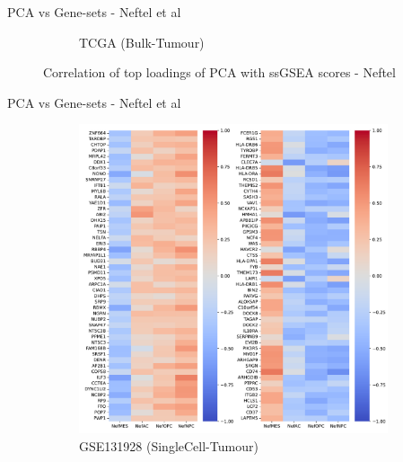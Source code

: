 \documentclass[aspectratio=169,9pt]{beamer}
\begin{document}
\begin{frame}{PCA vs Gene-sets - Neftel et al}
\begin{adjustwidth}{-5cm}{-5cm}
\begin{figure}
\begin{subfigure}[c]{0.48\textwidth}
                    \caption{TCGA (Bulk-Tumour)}
                \end{subfigure}
                \caption{Correlation of top loadings of PCA with ssGSEA scores - Neftel}
            \end{figure}
        \end{adjustwidth}
    \end{frame}

    \begin{frame}{PCA vs Gene-sets - Neftel et al}
        \begin{adjustwidth}{-5cm}{-5cm}
            \centering
            \begin{figure}\ContinuedFloat
                \centering
                \begin{subfigure}[c]{0.48\textwidth}
                    \centering
                    \includegraphics[width=\textwidth]{GSM3828672_load-corr_Nef}
                    \caption{GSE131928 (SingleCell-Tumour)}
                \end{subfigure}
                \begin{subfigure}[c]{0.48\textwidth}
                    \centering

\end{subfigure}
\end{figure}
\end{adjustwidth}
\end{frame}
\end{document}
